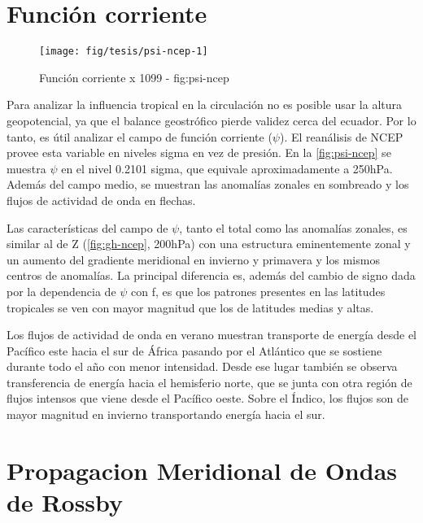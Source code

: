 \documentclass[spanish,a4paper]{book}
\begin{document}
\section{Función corriente}\label{funcion-corriente}

\begin{landscape}\begin{figure}

{\centering \texttt{[image: fig/tesis/psi-ncep-1]} 

}

\caption{Función corriente x 1099 - fig:psi-ncep}\label{fig:psi-ncep}
\end{figure}
\end{landscape}

Para analizar la influencia tropical en la circulación no es posible
usar la altura geopotencial, ya que el balance geostrófico pierde
validez cerca del ecuador. Por lo tanto, es útil analizar el campo de
función corriente (\(\psi\)). El reanálisis de NCEP provee esta variable
en niveles sigma en vez de presión. En la \autoref{fig:psi-ncep} se
muestra \(\psi\) en el nivel 0.2101 sigma, que equivale aproximadamente
a 250hPa. Además del campo medio, se muestran las anomalías zonales en
sombreado y los flujos de actividad de onda en flechas.

Las características del campo de \(\psi\), tanto el total como las
anomalías zonales, es similar al de Z (\autoref{fig:gh-ncep}, 200hPa)
con una estructura eminentemente zonal y un aumento del gradiente
meridional en invierno y primavera y los mismos centros de anomalías. La
principal diferencia es, además del cambio de signo dada por la
dependencia de \(\psi\) con f, es que los patrones presentes en las
latitudes tropicales se ven con mayor magnitud que los de latitudes
medias y altas.

Los flujos de actividad de onda en verano muestran transporte de energía
desde el Pacífico este hacia el sur de África pasando por el Atlántico
que se sostiene durante todo el año con menor intensidad. Desde ese
lugar también se observa transferencia de energía hacia el hemisferio
norte, que se junta con otra región de flujos intensos que viene desde
el Pacífico oeste. Sobre el Índico, los flujos son de mayor magnitud en
invierno transportando energía hacia el sur.

\section{Propagacion Meridional de Ondas de
Rossby}\label{propagacion-meridional-de-ondas-de-rossby}
\end{document}
